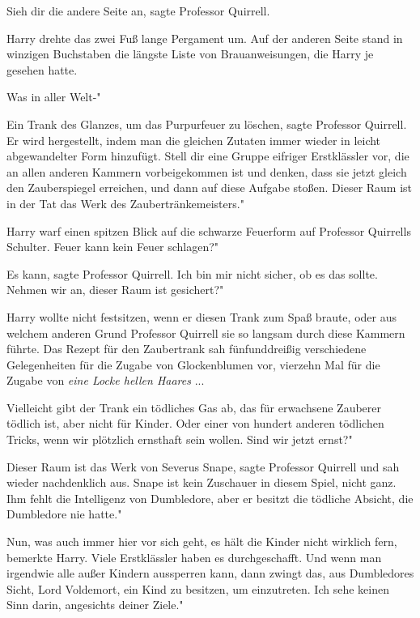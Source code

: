 \glqq Sieh dir die andere Seite an\grqq{}, sagte Professor Quirrell.

Harry drehte das zwei Fuß lange Pergament um. Auf der anderen Seite stand in
winzigen Buchstaben die längste Liste von Brauanweisungen, die Harry je gesehen
hatte.

\glqq Was in aller Welt-"

\glqq Ein Trank des Glanzes, um das Purpurfeuer zu löschen\grqq{}, sagte
Professor Quirrell. \glqq Er wird hergestellt, indem man die gleichen Zutaten
immer wieder in leicht abgewandelter Form hinzufügt. Stell dir eine Gruppe
eifriger Erstklässler vor, die an allen anderen Kammern vorbeigekommen ist und
denken, dass sie jetzt gleich den Zauberspiegel erreichen, und dann auf diese
Aufgabe stoßen. Dieser Raum ist in der Tat das Werk des Zaubertränkemeisters."

Harry warf einen spitzen Blick auf die schwarze Feuerform auf Professor
Quirrells Schulter. \glqq Feuer kann kein Feuer schlagen?"

\glqq Es kann\grqq{}, sagte Professor Quirrell. \glqq Ich bin mir nicht sicher,
ob es das sollte. Nehmen wir an, dieser Raum ist gesichert?"

Harry wollte nicht festsitzen, wenn er diesen Trank zum Spaß braute, oder aus
welchem anderen Grund Professor Quirrell sie so langsam durch diese Kammern
führte. Das Rezept für den Zaubertrank sah fünfunddreißig verschiedene
Gelegenheiten für die Zugabe von Glockenblumen vor, vierzehn Mal für die Zugabe
von \emph{\glqq eine Locke hellen Haares\grqq{} }...

\glqq Vielleicht gibt der Trank ein tödliches Gas ab, das für erwachsene
Zauberer tödlich ist, aber nicht für Kinder. Oder einer von hundert anderen
tödlichen Tricks, wenn wir plötzlich ernsthaft sein wollen. Sind wir jetzt
ernst?"

\glqq Dieser Raum ist das Werk von Severus Snape\grqq{}, sagte Professor
Quirrell und sah wieder nachdenklich aus. \glqq Snape ist kein Zuschauer in
diesem Spiel, nicht ganz. Ihm fehlt die Intelligenz von Dumbledore, aber er
besitzt die tödliche Absicht, die Dumbledore nie hatte."

\glqq Nun, was auch immer hier vor sich geht, es hält die Kinder nicht wirklich
fern\grqq{}, bemerkte Harry. \glqq Viele Erstklässler haben es durchgeschafft.
Und wenn man irgendwie alle außer Kindern aussperren kann, dann zwingt das, aus
Dumbledores Sicht, Lord Voldemort, ein Kind zu besitzen, um einzutreten. Ich
sehe keinen Sinn darin, angesichts deiner Ziele."

